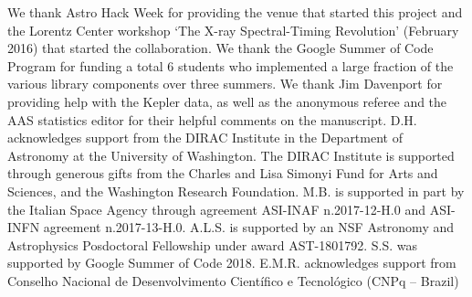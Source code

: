 \documentclass[twocolumn]{aastex62}
\begin{document}

\acknowledgments

We thank Astro Hack Week for providing the venue that started this project and the Lorentz Center workshop `The X-ray Spectral-Timing Revolution' (February 2016) that started the collaboration. 
We thank the Google Summer of Code Program for funding a total 6 students who implemented a large fraction of the various library components over three summers. We thank Jim Davenport for providing help with the Kepler data, as well as the anonymous referee and the AAS statistics editor for their helpful comments on the manuscript.
D.H. acknowledges support from the DIRAC Institute in the Department of Astronomy at the University of Washington. 
The DIRAC Institute is supported through generous gifts from the Charles and Lisa Simonyi Fund for Arts and Sciences, and the Washington Research Foundation.
M.B. is supported in part by the Italian Space Agency through agreement ASI-INAF n.2017-12-H.0 and ASI-INFN agreement n.2017-13-H.0.
A.L.S. is supported by an NSF Astronomy and Astrophysics Posdoctoral Fellowship under award AST-1801792.
S.S. was supported by Google Summer of Code 2018.
E.M.R. acknowledges support from Conselho Nacional de Desenvolvimento Cient\'ifico e Tecnol\'ogico (CNPq -- Brazil)











\end{document}
